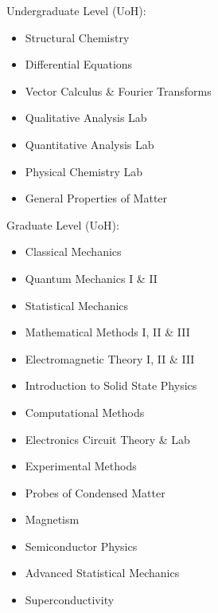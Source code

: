 \begin{multicols}{3}

{Undergraduate Level (UoH):}
\begin{itemize}[leftmargin=.4cm, noitemsep,topsep=0pt,parsep=0pt,partopsep=0pt] %
\item Structural Chemistry
\item Differential Equations
\item Vector Calculus \& Fourier Transforms
\item Qualitative Analysis Lab
\item Quantitative Analysis Lab
\item Physical Chemistry Lab
\item General Properties of Matter
\end{itemize}

\columnbreak

{Graduate Level (UoH):}
\begin{itemize}[leftmargin=.4cm, noitemsep,topsep=0pt,parsep=0pt,partopsep=0pt] %
\item Classical Mechanics
\item Quantum Mechanics I \& II
\item Statistical Mechanics
\item Mathematical Methods I, II \& III
\item Electromagnetic Theory I, II \& III
\item Introduction to Solid State Physics
\item Computational Methods
\item Electronics Circuit Theory \& Lab
\item Experimental Methods
\item Probes of Condensed Matter
\item Magnetism
\item Semiconductor Physics
\item Advanced Statistical Mechanics
\item Superconductivity
\end{itemize}
\end{multicols}